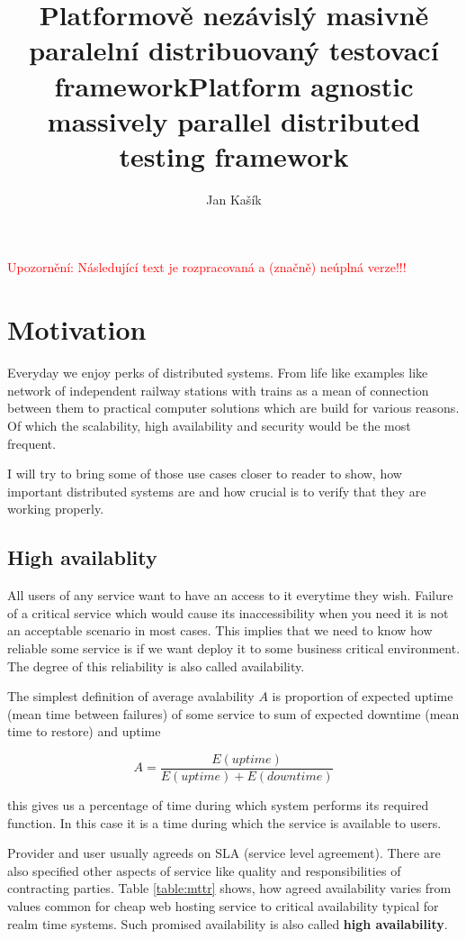 \documentclass[
  master,
  biblatex,
  glossaries,
  index
]{kidiplom}
\title{Platformově nezávislý masivně paralelní distribuovaný testovací framework}
\title[english]{Platform agnostic massively parallel distributed testing framework}
\author{Jan Kašík}
\begin{document}
\maketitle

\noindent\textcolor{red}{\LARGE Upozornění: Následující text je rozpracovaná a (značně) neúplná verze!!!}

\section{Motivation}

Everyday we enjoy perks of distributed systems. From life like examples like network of independent railway stations with trains as a mean of connection between them to practical computer solutions which are build for various reasons. Of which the scalability, high availability and security would be the most frequent.

I will try to bring some of those use cases closer to reader to show, how important distributed systems are and how crucial is to verify that they are working properly.

\subsection{High availablity}

All users of any service want to have an access to it everytime they wish. Failure of a critical service which would cause its inaccessibility when you need it is not an acceptable scenario in most cases. This implies that we need to know how reliable some service is if we want deploy it to some business critical environment. The degree of this reliability is also called availability.

The simplest definition of average avalability $A$ is proportion of expected uptime (mean time between failures) of some service to sum of expected downtime (mean time to restore) and uptime

$$A=\frac{E(uptime)}{E(uptime) + E(downtime)}$$

this gives us a percentage of time during which system performs its required function\cite{bib:reliability}. In this case it is a time during which the service is available to users.

Provider and user usually agreeds on SLA (service level agreement). There are also specified other aspects of service like quality and responsibilities of contracting parties. Table \ref{table:mttr} shows, how agreed availability varies from values common for cheap web hosting service to critical availability typical for realm time systems. Such promised availability is also called {\bf high availability}.
\end{document}
